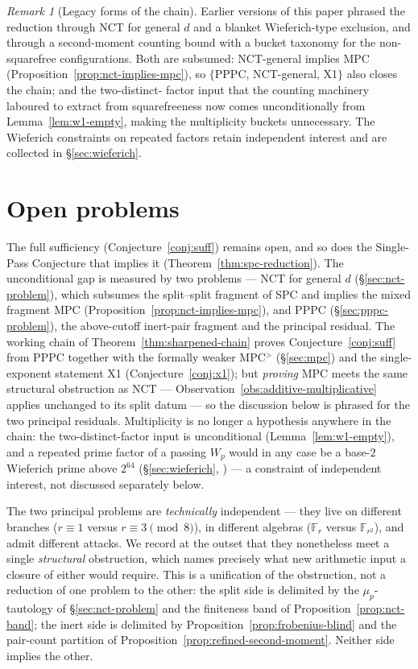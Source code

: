 \documentclass[11pt]{amsart}
\theoremstyle{plain}
\theoremstyle{definition}
\theoremstyle{remark}
\newtheorem{remark}[theorem]{Remark}
\numberwithin{equation}{section}
\newcommand{\F}{\mathbb{F}}
\begin{document}
\begin{remark}[Legacy forms of the chain]\label{rem:legacy-chains}
Earlier versions of this paper phrased the reduction through NCT for
general $d$ and a blanket Wieferich-type exclusion, and through a
second-moment counting bound with a bucket taxonomy for the
non-squarefree configurations. Both are subsumed: NCT-general implies
MPC (Proposition~\ref{prop:nct-implies-mpc}), so
$\{$PPPC, NCT-general, X1$\}$ also closes the chain; and the two-distinct-
factor input that the counting machinery laboured to extract from
squarefreeness now comes unconditionally from
Lemma~\ref{lem:w1-empty}, making the multiplicity buckets unnecessary.
The Wieferich constraints on repeated factors retain independent
interest and are collected in \S\ref{sec:wieferich}.
\end{remark}

\section{Open problems}\label{sec:open-problems}

The full sufficiency (Conjecture~\ref{conj:suff}) remains open, and so does the Single-Pass Conjecture that implies it (Theorem~\ref{thm:spc-reduction}). The unconditional gap is measured by two problems --- NCT for general $d$ (\S\ref{sec:nct-problem}), which subsumes the split--split fragment of SPC and implies the mixed fragment MPC (Proposition~\ref{prop:nct-implies-mpc}), and PPPC (\S\ref{sec:pppc-problem}), the above-cutoff inert-pair fragment and the principal residual. The working chain of Theorem~\ref{thm:sharpened-chain} proves Conjecture~\ref{conj:suff} from PPPC together with the formally weaker MPC$^{>}$ (\S\ref{sec:mpc}) and the single-exponent statement X1 (Conjecture~\ref{conj:x1}); but \emph{proving} MPC meets the same structural obstruction as NCT --- Observation~\ref{obs:additive-multiplicative} applies unchanged to its split datum --- so the discussion below is phrased for the two principal residuals. Multiplicity is no longer a hypothesis anywhere in the chain: the two-distinct-factor input is unconditional (Lemma~\ref{lem:w1-empty}), and a repeated prime factor of a passing $W_p$ would in any case be a base-$2$ Wieferich prime above $2^{64}$ (\S\ref{sec:wieferich}, \cite{ref:OEISWieferich}) --- a constraint of independent interest, not discussed separately below.

The two principal problems are \emph{technically} independent --- they live on different branches ($r \equiv 1$ versus $r \equiv 3 \pmod 8$), in different algebras ($\F_r$ versus $\F_{r^2}$), and admit different attacks. We record at the outset that they nonetheless meet a single \emph{structural} obstruction, which names precisely what new arithmetic input a closure of either would require. This is a unification of the obstruction, not a reduction of one problem to the other: the split side is delimited by the $\mu_p$-tautology of \S\ref{sec:nct-problem} and the finiteness band of Proposition~\ref{prop:nct-band}; the inert side is delimited by Proposition~\ref{prop:frobenius-blind} and the pair-count partition of Proposition~\ref{prop:refined-second-moment}. Neither side implies the other.
\end{document}
